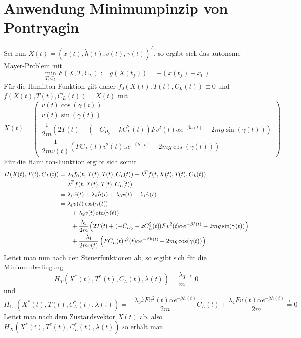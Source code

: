 \section{Anwendung Minimumpinzip von Pontryagin}
Sei nun $\dot{X}(t) = (\dot{x}(t), \dot{h}(t),\dot{v}(t),\dot{\gamma}(t))^T$, so ergibt sich das autonome Mayer-Problem mit \[\min_{T,C_L} F(X,T,C_L) := g(X(t_f)) =  -(x(t_f) - x_0)\] Für die Hamilton-Funktion gilt daher $f_0(X(t),T(t),C_L(t)) \equiv 0$ und $f(X(t),T(t),C_L(t)) = \dot{X}(t)$ mit
\[\dot{X}(t) = \begin{pmatrix}
v(t) \cos(\gamma(t)) \\ 
v(t) \sin(\gamma(t)) \\ 
\dfrac{1}{2m} \left(2T(t) + (-C_{D_0}-k C_L^2(t)) F  v^2(t) \alpha e^{-\beta h(t)} - 2 m g \sin(\gamma(t)) \right) \\ 
\dfrac{1}{2mv(t)} \left(F C_L(t)v^2(t) \alpha e^{-\beta h(t)} - 2 m g \cos(\gamma(t)) \right)
\end{pmatrix} \]
Für die Hamilton-Funktion ergibt sich somit 
\[\begin{split}
H(X(t),T(t),C_L(t)) &= \lambda_0 f_0(t,X(t),T(t),C_L(t)) + \lambda^T f(t,X(t),T(t),C_L(t)) \\\
&= \lambda^T f(t,X(t),T(t),C_L(t)) \\\
&= \lambda_1 \dot{x}(t) + \lambda_2 \dot{h}(t) + \lambda_3 \dot{v}(t) + \lambda_4 \dot{\gamma}(t) \\\
&= \lambda_1 v(t) \cos(\gamma(t)) \\\
&\hspace{7mm} + \lambda_2 v(t) \sin(\gamma(t)) \\\
&\hspace{7mm} + \dfrac{\lambda_3}{2m} \left(2T(t) + (-C_{D_0}-k C_L^2(t)) F  v^2(t) \alpha e^{-\beta h(t)} - 2 m g \sin(\gamma(t)) \right) \\\
&\hspace{7mm} + \dfrac{\lambda_4}{2mv(t)} \left(F C_L(t)v^2(t) \alpha e^{-\beta h(t)} - 2 m g \cos(\gamma(t)) \right) 
\end{split}\]
Leitet man nun nach den Steuerfunktionen ab, so ergibt sich für die Minimumbedingung
\[H_{T}(X^{\ast}(t),T^{\ast}(t),C_L(t),\lambda(t)) = \dfrac{\lambda_3}{m} \stackrel{!}{=} 0\]
und 
\[H_{C_L}(X^{\ast}(t),T(t),C_L^{\ast}(t),\lambda(t)) = - \dfrac{\lambda_3 k F v^2(t) \alpha e^{-\beta h(t)}}{2m} C_L(t)  + \dfrac{\lambda_4 F v(t) \alpha e^{-\beta h(t)}}{2m} \stackrel{!}{=} 0 \]
Leitet man nach dem Zustandsvektor $X(t)$ ab, also $H_{X}(X^{\ast}(t),T^{\ast}(t),C_L^{\ast}(t),\lambda(t))$ so erhält man 
